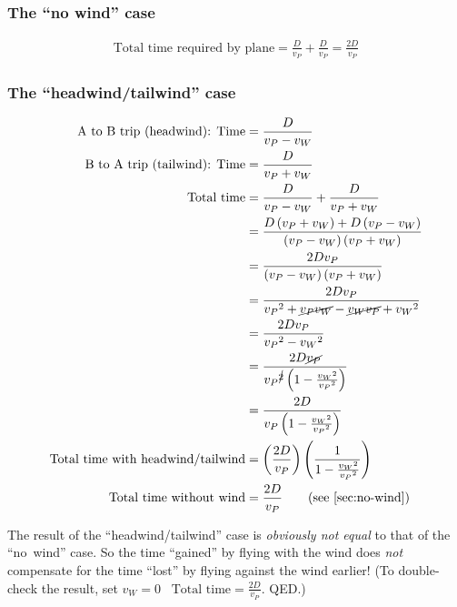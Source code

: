 \documentclass[pagesize,headsepline,10pt,parskip=half]{scrreprt}
\begin{document}
        \subsubsection{The “no wind” case}\label{sec:no-wind}
          \begin{align*}
            \text{Total time required by plane} = \frac{D}{v_P} + \frac{D}{v_P} = \frac{2D}{v_P}
          \end{align*}

        \subsubsection{The “headwind/tailwind” case}
          \begin{align*}
            \text{A to B trip (headwind): Time} &= \frac{D}{v_P - v_W}\\
            \text{B to A trip (tailwind): Time} &= \frac{D}{v_P + v_W}\\
            \text{Total time} &= \frac{D}{v_P - v_W} + \frac{D}{v_P + v_W}\\
            &= \frac{D\left(v_P + v_W\right) + D\left(v_P - v_W\right)}{\left(v_P - v_W\right) \left(v_P + v_W\right)}\\
            &= \frac{2 D v_P}{\left(v_P - v_W\right) \left(v_P + v_W\right)}\\
            &= \frac{2 D v_P}{{v_P}^2 + \cancel{v_P v_W} - \cancel{v_W v_P} + {v_W}^2}\\
            &= \frac{2 D v_P}{{v_P}^2 - {v_W}^2}\\
            &= \frac{2 D \cancel{v_P}}{{v_P}^{\cancel{2}} \left(1 - \frac{{v_W}^2}{{v_P}^2}\right)}\\
            &= \frac{2 D}{{v_P} \left(1 - \frac{{v_W}^2}{{v_P}^2}\right)}\\
            \text{Total time with headwind/tailwind} &= \left(\frac{2 D}{v_P}\right) \left(\frac{1}{1 - \frac{{v_W}^2}{{v_P}^2}}\right)\\
            \text{Total time without wind} &= \frac{2 D}{v_P} \qquad \text{(see~\ref{sec:no-wind})}
          \end{align*}

          The result of the “headwind/tailwind” case is \emph{obviously not equal}
          to that of the “no~wind” case.  So the time ``gained'' by flying with
          the wind does \emph{not} compensate for the time ``lost'' by flying
          against the wind earlier!  (To double-check the result, set $v_W = 0$
          \rightarrow~$\text{Total time} = \frac{2D}{v_P}$. QED.)
\end{document}
